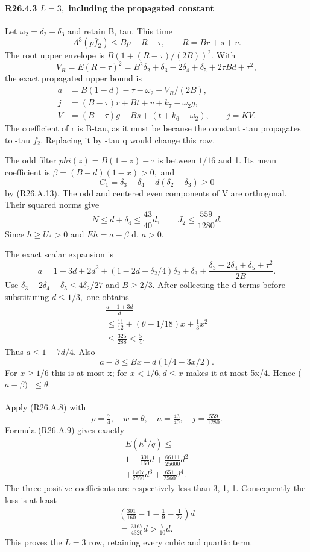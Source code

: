 \paragraph{R26.4.3 \(L=3,\allowbreak \) including the propagated constant}\label{part:R26.4.3}

Let \(\omega_2=\delta_2-\delta_3\) and retain B, tau. This time
\[
A^3(p\bar f_2)\le Bp+R-\tau,\qquad R=Br+s+v.
\]
The root upper envelope is \(B(1+(R-\tau)/(2B))^2.\) With
\[
V_R=E(R-\tau)^2
=B^2\delta_2+\delta_3-2\delta_4+\delta_5+2\tau Bd+\tau^2,
\]
the exact propagated upper bound is
\[
\begin{aligned}
a&=B(1-d)-\tau-\omega_2+V_R/(2B),\\
j&=(B-\tau)r+Bt+v+k_7-\omega_2g,\\
V&=(B-\tau)g+Bs+(t+k_6-\omega_2),\qquad j=KV.
\end{aligned}                                                        \tag{R26.A.15}
\]
The coefficient of r is B-tau, as it must be because the constant -tau
propagates to -tau \(\bar f_2.\) Replacing it by -tau q would change this row.

The odd filter \(phi(z)=B(1-z)-\tau\) is between \(1/16\) and 1. Its mean
coefficient is \(\beta=(B-d)(1-x)>0,\allowbreak \) and
\[
C_1=\delta_3-\delta_4-d(\delta_2-\delta_3)\ge0
\]
by (R26.A.13). The odd and centered even components of V are orthogonal.
Their squared norms give
\[
N\le d+\delta_4\le\frac{43}{40}d,\qquad
J_2\le\frac{559}{1280}d.
\]
Since \(h\ge U_*>0\) and \(Eh=a-\beta\) d, \(a>0.\)

The exact scalar expansion is
\[
a=1-3d+2d^2+(1-2d+\delta_2/4)\delta_2+\delta_3
+\frac{\delta_3-2\delta_4+\delta_5+\tau^2}{2B}.
\]
Use \(\delta_3-2\delta_4+\delta_5\le 4\delta_2/27\) and \(B\ge 2/3.\) After collecting the d terms before
substituting \(d\le 1/3,\allowbreak \) one obtains
\[
\begin{gathered}
\frac{a-1+3d}{d}\\
\le\frac{11}{12}+(\theta-1/18)x+\frac13x^2\\
\le\frac{325}{288}<\frac54.
\end{gathered}
\]
Thus \(a\le 1-7d/4.\) Also
\[
a-\beta\le Bx+d(1/4-3x/2).
\]
For \(x\ge 1/6\) this is at most x; for \(x<1/6,\allowbreak  d\le x\) makes it at most 5x/4.
Hence (\(a-\beta)_+\le \theta.\)

Apply (R26.A.8) with
\[
\rho=\tfrac74,\quad w=\theta,\quad n=\tfrac{43}{40},
\quad j=\tfrac{559}{1280}.
\]
Formula (R26.A.9) gives exactly
\[
\begin{gathered}
E(h^4/q)\le\\
1-\frac{301}{160}d+\frac{66111}{25600}d^2\\
+\frac{1707}{2560}d^3+\frac{651}{2560}d^4.
\end{gathered}
\]
The three positive coefficients are respectively less than 3, 1, 1.
Consequently the loss is at least
\[
\begin{gathered}
\left(\frac{301}{160}-1-\frac19-\frac1{27}\right)d\\
=\frac{3167}{4320}d>\frac7{10}d.
\end{gathered}
\]
This proves the \(L=3\) row, retaining every cubic and quartic term.

